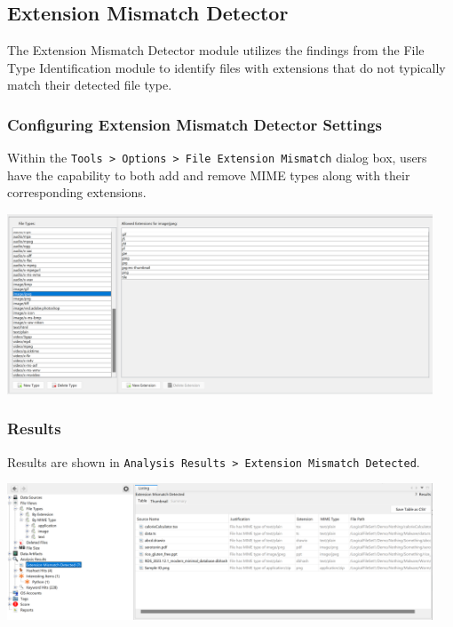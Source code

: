 \documentclass{article}
\begin{document}
\subsection{Extension Mismatch Detector}
The Extension Mismatch Detector module utilizes the findings from the File Type Identification module to identify files with extensions that do not typically match their detected file type.

\subsubsection*{Configuring Extension Mismatch Detector Settings}
Within the \lstinline{Tools > Options > File Extension Mismatch} dialog box, users have the capability to both add and remove MIME types along with their corresponding extensions.

\begin{center}
    \includegraphics[width=0.95\textwidth]{3/3.5/Extension Mismatch Detector Settings .png}
\end{center}

\subsubsection*{Results}
Results are shown in \texttt{Analysis Results > Extension Mismatch Detected}.

\begin{center}
    \includegraphics[width=0.95\textwidth]{3/3.5/Details of Mismatched Files.png}
\end{center}
\end{document}
